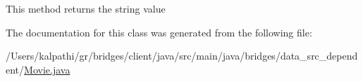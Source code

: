 This method returns the string value 

The documentation for this class was generated from the following file\+:\begin{DoxyCompactItemize}
\item 
/\+Users/kalpathi/gr/bridges/client/java/src/main/java/bridges/data\+\_\+src\+\_\+dependent/\mbox{\hyperlink{_movie_8java}{Movie.\+java}}\end{DoxyCompactItemize}
